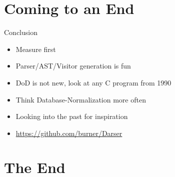 \documentclass[aspectratio=169,notes]{beamer}
\begin{document}
	\section{Coming to an End}
	\begin{frame}[fragile]{Conclusion}
		\begin{itemize}
			\item Measure first \vspace{1cm}
			\item Parser/AST/Visitor generation is fun
			\item DoD is not new, look at any C program from 1990
			\item Think Database-Normalization more often
			\item Looking into the past for inspiration
			\vfill{}
			\item \url{https://github.com/burner/Darser}
		\end{itemize}
	\end{frame}

	\section{The End}
\end{document}
